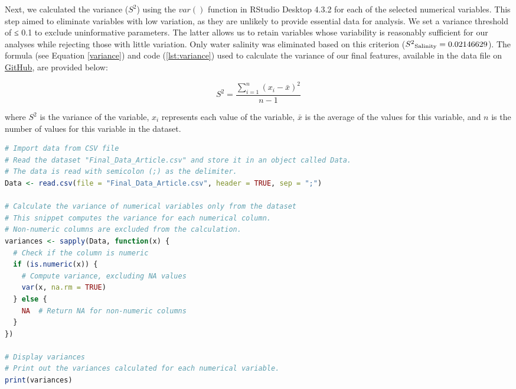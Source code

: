 Next, we calculated the variance ($S^2$) using the $var()$ function in RStudio Desktop 4.3.2 for each of the selected numerical variables. This step aimed to eliminate variables with low variation, as they are unlikely to provide essential data for analysis. We set a variance threshold of ≤ 0.1 to exclude uninformative parameters. The latter allows us to retain variables whose variability is reasonably sufficient for our analyses while rejecting those with little variation. Only water salinity was eliminated based on this criterion ($S^2\textsubscript{Salinity} = 0.02146629$). The formula (see Equation \ref{variance}) and code (\autoref{lst:variance}) used to calculate the variance of our final features, available in the data file on \href{https://github.com/tahiri-lab/Cumacea_aPhyloGeo}{GitHub}, are provided below:

\begin{equation}\label{variance}
    S^2 = \frac{\sum_{i=1}^{n} (x_i - \bar{x})^2}{n-1}
\end{equation}

where $S^2$ is the variance of the variable, $x_i$ represents each value of the variable, $\bar{x}$ is the average of the values for this variable, and $n$ is the number of values for this variable in the dataset.

\begin{lstlisting}[label=lst:variance,language=R,caption=RStudio script to calculate the variance of each numerical variables in our final dataset]
# Import data from CSV file
# Read the dataset "Final_Data_Article.csv" and store it in an object called Data.
# The data is read with semicolon (;) as the delimiter.
Data <- read.csv(file = "Final_Data_Article.csv", header = TRUE, sep = ";")

# Calculate the variance of numerical variables only from the dataset
# This snippet computes the variance for each numerical column.
# Non-numeric columns are excluded from the calculation.
variances <- sapply(Data, function(x) {
  # Check if the column is numeric
  if (is.numeric(x)) {
    # Compute variance, excluding NA values
    var(x, na.rm = TRUE)
  } else {
    NA  # Return NA for non-numeric columns
  }
})

# Display variances
# Print out the variances calculated for each numerical variable.
print(variances)
\end{lstlisting}

